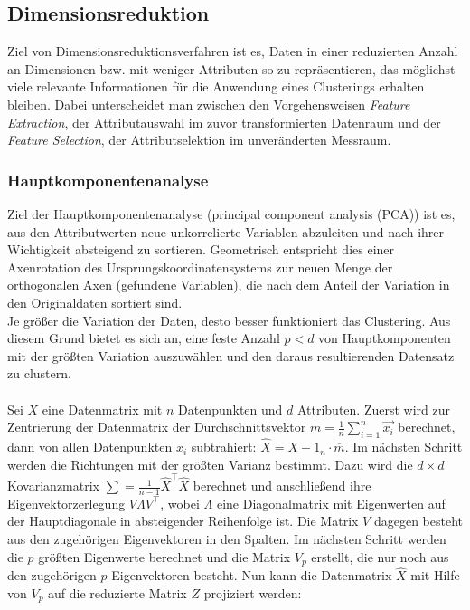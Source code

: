 \documentclass[11pt,ceqn]{book}
\begin{document}
\subsection{Dimensionsreduktion}
Ziel von Dimensionsreduktionsverfahren ist es, Daten in einer reduzierten Anzahl an Dimensionen bzw. mit weniger Attributen so zu repräsentieren, das möglichst viele relevante Informationen für die Anwendung eines Clusterings erhalten bleiben. Dabei unterscheidet man zwischen den Vorgehensweisen \textit{Feature Extraction}, der Attributauswahl im zuvor transformierten Datenraum und der \textit{Feature Selection}, der Attributselektion im unveränderten Messraum.

\subsubsection{Hauptkomponentenanalyse}
Ziel der Hauptkomponentenanalyse \cite{pca} (principal component analysis (PCA)) ist es, aus den Attributwerten neue unkorrelierte Variablen abzuleiten und nach ihrer Wichtigkeit absteigend zu sortieren. Geometrisch entspricht dies einer Axenrotation des Ursprungskoordinatensystems zur neuen Menge der orthogonalen Axen (gefundene Variablen), die nach dem Anteil der Variation in den Originaldaten sortiert sind.\\

Je größer die Variation der Daten, desto besser funktioniert das Clustering. Aus diesem Grund bietet es sich an, eine feste Anzahl $p<d$ von Hauptkomponenten mit der größten Variation auszuwählen und den daraus resultierenden Datensatz zu clustern.
\\~\\

Sei $X$ eine Datenmatrix mit $n$ Datenpunkten und $d$ Attributen.
Zuerst wird zur Zentrierung der Datenmatrix der Durchschnittsvektor $\overline{m} = \frac{1}{n}\sum\limits_{i=1}^n \vec{x_i}$ berechnet, dann von allen Datenpunkten $x_i$ subtrahiert: $\hat{X} = X - 1_n \cdot \overline{m}$. Im nächsten Schritt werden die Richtungen mit der größten Varianz bestimmt. Dazu wird die $d\times d$ Kovarianzmatrix $\sum=\frac{1}{n-1}\hat{X}^\top \hat{X}$ berechnet und anschließend ihre Eigenvektorzerlegung $V \Lambda V^\top$, wobei $\Lambda$ eine Diagonalmatrix mit Eigenwerten auf der Hauptdiagonale in absteigender Reihenfolge ist. Die Matrix $V$ dagegen besteht aus den zugehörigen Eigenvektoren in den Spalten. Im nächsten Schritt werden die $p$ größten Eigenwerte berechnet und die Matrix $V_p$ erstellt, die nur noch aus den zugehörigen $p$ Eigenvektoren besteht. Nun kann die Datenmatrix $\hat{X}$ mit Hilfe von $V_p$ auf die reduzierte Matrix $Z$ projiziert werden:
\end{document}
